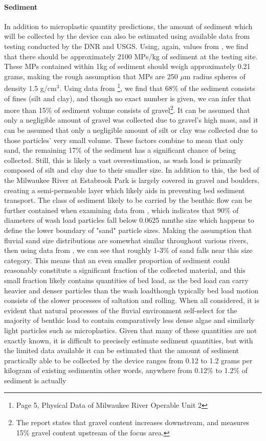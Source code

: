 \documentclass[fleqn,10pt]{SelfArx} %
\begin{document}
	\paragraph{Sediment}
	In addition to microplastic quantity predictions, the amount of sediment which will be collected by the device can also be estimated using available data from testing conducted by the DNR and USGS. Using, again, values from \cite{LenakerEtAlvertdist}, we find that there should be approximately 2100 MPs/kg of sediment at the testing site. These MPs contained within 1kg of sediment should weigh approximately 0.21 grams, making the rough assumption that MPs are 250 $\mu$m radius spheres of density 1.5 g/cm$^3$. Using data from \cite{Foth2020}\footnote{Page 5, Physical Data of Milwaukee River Operable Unit 2}, we find that 68\% of the sediment consists of fines (silt and clay), and though no exact number is given, we can infer that more than 15\% of sediment volume consists of gravel\footnote{The report states that gravel content increases downstream, and measures 15\% gravel content upstream of the focus area.}. It can be assumed that only a negligible amount of gravel was  collected due to gravel's high mass, and it can be assumed that only a negligible amount of silt or clay was collected due to those particles' very small volume. These factors combine to mean that only sand, the remaining 17\% of the sediment has a significant chance of being collected. Still, this is likely a vast overestimation, as wash load is primarily composed of silt and clay due to their smaller size. In addition to this, the bed of the Milwaukee River at Estabrook Park is largely covered in gravel and boulders, creating a semi-permeable layer which likely aids in preventing bed sediment transport. The class of sediment likely to be carried by the \gls{benthic} flow can be further contained when examining data from \cite{Washload_size}, which indicates that 90\% of diameters of wash load particles fall below 0.0625 mm\textemdash the size which happens to define the lower boundary of "sand" particle sizes. Making the assumption that fluvial sand size distributions are somewhat similar throughout various rivers, then using data from \cite{sabd_size_distribution}, we can see that roughly 1-3\% of sand falls near this size category. This means that an even smaller proportion of sediment could reasonably constitute a significant fraction of the collected material, and this small fraction likely contains quantities of bed load, as the bed load can carry heavier and denser particles than the wash load\textemdash though typically bed load motion consists of the slower processes of \gls{saltation} and \gls{rolling}. When all considered, it is evident that natural processes of the fluvial environment self-select for the majority of \gls{benthic} load to contain comparatively less dense algae and similarly light particles such as microplastics. Given that many of these quantities are not exactly known, it is difficult to precisely estimate sediment quantities, but with the limited data available it can be estimated that the amount of sediment practically able to be collected by the device ranges from 0.12 to 1.2 grams per kilogram of existing sediment\textemdash in other words, anywhere from 0.12\% to 1.2\% of sediment is actually 
\end{document}
